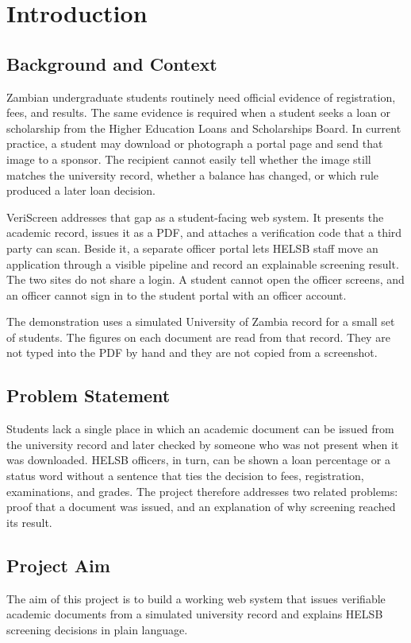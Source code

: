 \documentclass[12pt,a4paper]{report}
\begin{document}
\clearpage

\chapter{Introduction}

\section{Background and Context}
Zambian undergraduate students routinely need official evidence of registration, fees, and results. The same evidence is required when a student seeks a loan or scholarship from the Higher Education Loans and Scholarships Board. In current practice, a student may download or photograph a portal page and send that image to a sponsor. The recipient cannot easily tell whether the image still matches the university record, whether a balance has changed, or which rule produced a later loan decision.

VeriScreen addresses that gap as a student-facing web system. It presents the academic record, issues it as a PDF, and attaches a verification code that a third party can scan. Beside it, a separate officer portal lets HELSB staff move an application through a visible pipeline and record an explainable screening result. The two sites do not share a login. A student cannot open the officer screens, and an officer cannot sign in to the student portal with an officer account.

The demonstration uses a simulated University of Zambia record for a small set of students. The figures on each document are read from that record. They are not typed into the PDF by hand and they are not copied from a screenshot.

\section{Problem Statement}
Students lack a single place in which an academic document can be issued from the university record and later checked by someone who was not present when it was downloaded. HELSB officers, in turn, can be shown a loan percentage or a status word without a sentence that ties the decision to fees, registration, examinations, and grades. The project therefore addresses two related problems: proof that a document was issued, and an explanation of why screening reached its result.

\section{Project Aim}
The aim of this project is to build a working web system that issues verifiable academic documents from a simulated university record and explains HELSB screening decisions in plain language.
\end{document}

